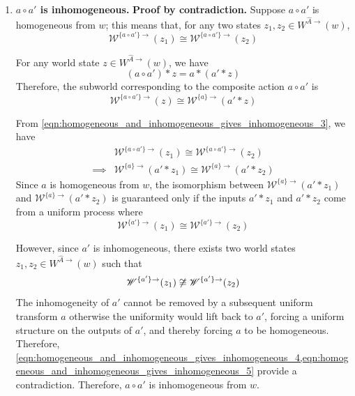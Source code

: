 \begin{proofE}
\begin{enumerate}[(1)]
    \item \textbf{$a \circ a'$ is inhomogeneous.}
    \textbf{Proof by contradiction.}
    Suppose $a \circ a'$ is homogeneous from $w$; this means that, for any two states $z_{1}, z_{2} \in W^{\hat{A}\to}(w)$,
    \begin{equation}
        \mathscr{W}^{\{a \circ a'\}\to}(z_{1}) \cong \mathscr{W}^{\{a \circ a'\}\to}(z_{2})
    \end{equation}
    
    For any world state $z \in W^{\hat{A}\to}(w)$, we have
    \begin{equation}
        (a \circ a') \ast z = a \ast (a' \ast z)
    \end{equation}
    Therefore, the subworld corresponding to the composite action $a \circ a'$ is
    \begin{equation}
    \label{eqn:homogeneous_and_inhomogeneous_gives_inhomogeneous_3}
        \mathscr{W}^{\{a \circ a'\}\to}(z) \cong \mathscr{W}^{\{a\}\to}(a' \ast z)
    \end{equation}

    From \cref{eqn:homogeneous_and_inhomogeneous_gives_inhomogeneous_3}, we have
    \begin{align}
        & \mathscr{W}^{\{a \circ a'\}\to}(z_{1}) \cong \mathscr{W}^{\{a \circ a'\}\to}(z_{2}) \\
        \implies & \mathscr{W}^{\{a\}\to}(a' \ast z_{1}) \cong \mathscr{W}^{\{a\}\to}(a' \ast z_{2})
    \end{align}
    Since $a$ is homogeneous from $w$, the isomorphism between $\mathscr{W}^{\{a\}\to}(a' \ast z_{1})$ and $\mathscr{W}^{\{a\}\to}(a' \ast z_{2})$ is guaranteed only if the inputs $a' \ast z_{1}$ and $a' \ast z_{2}$ come from a uniform process where
    \begin{equation}
    \label{eqn:homogeneous_and_inhomogeneous_gives_inhomogeneous_4}
        \mathscr{W}^{\{a'\}\to}(z_{1}) \cong \mathscr{W}^{\{a'\}\to}(z_{2})
    \end{equation}

    However, since $a'$ is inhomogeneous, there exists two world states $z_{1}, z_{2} \in W^{\hat{A}\to}(w)$ such that
    \begin{equation}
    \label{eqn:homogeneous_and_inhomogeneous_gives_inhomogeneous_5}
        \mathscr{W}^{\{a'\}\to}(z_{1}) \centernot\cong \mathscr{W}^{\{a'\}\to}(z_{2})
    \end{equation}
    The inhomogeneity of $a'$ cannot be removed by a subsequent uniform transform $a$ otherwise the uniformity would lift back to $a'$, forcing a uniform structure on the outputs of $a'$, and thereby forcing $a$ to be homogeneous.
    Therefore, \cref{eqn:homogeneous_and_inhomogeneous_gives_inhomogeneous_4,eqn:homogeneous_and_inhomogeneous_gives_inhomogeneous_5} provide a contradiction.
    Therefore, $a \circ a'$ is inhomogeneous from $w$.
\end{enumerate}
\end{proofE}


